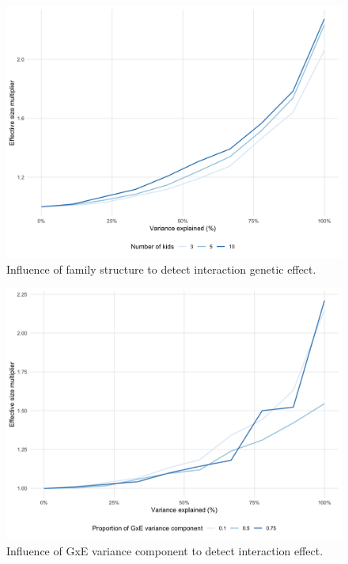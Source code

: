\documentclass[]{book}
\theoremstyle{definition}
\theoremstyle{definition}
\theoremstyle{definition}
\theoremstyle{remark}
\begin{document}
\begin{figure}

{\centering \includegraphics[width=1\linewidth]{figures/06-figure-sup-power-interaction-kids} 

}

\caption{Influence of family structure to detect
interaction genetic effect.}\label{fig:power-interaction-kids}
\end{figure}




\begin{figure}

{\centering \includegraphics[width=1\linewidth]{figures/04-figure-sup-power-interaction-prop} 

}

\caption{Influence of GxE variance component to
detect interaction effect.}\label{fig:power-interaction-prop}
\end{figure}




\backmatter
\end{document}

